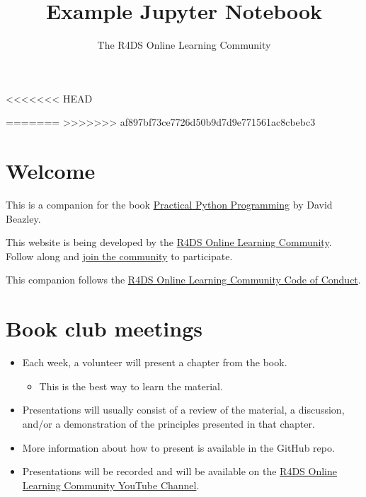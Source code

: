 \documentclass[
  letterpaper,
  DIV=11,
  numbers=noendperiod]{scrreprt}
\title{Example Jupyter Notebook}
\subtitle{The R4DS Online Learning Community}
\author{}
\date{}
\providecommand{\tightlist}{%
  \setlength{\itemsep}{0pt}\setlength{\parskip}{0pt}}
\renewcommand*\contentsname{Table of contents}
\begin{document}
\maketitle

<<<<<<< HEAD
\ifdefined\Shaded\renewenvironment{Shaded}{\begin{tcolorbox}[enhanced, sharp corners, boxrule=0pt, interior hidden, frame hidden, borderline west={3pt}{0pt}{shadecolor}]}{\end{tcolorbox}}\fi

=======
>>>>>>> af897bf73ce7726d50b9d7d9e771561ac8cbebc3
\renewcommand*\contentsname{Table of contents}
{
\hypersetup{linkcolor=}
\setcounter{tocdepth}{2}
\tableofcontents
}
\hypertarget{welcome}{%
\section*{Welcome}\label{welcome}}

This is a companion for the book
\href{https://dabeaz-course.github.io/practical-python/}{Practical
Python Programming} by David Beazley.

This website is being developed by the
\href{https://rfordatasci.com/}{R4DS Online Learning Community}. Follow
along and \href{https://r4ds.io/join}{join the community} to
participate.

This companion follows the \href{https://r4ds.io/conduct}{R4DS Online
Learning Community Code of Conduct}.

\hypertarget{book-club-meetings}{%
\section*{Book club meetings}\label{book-club-meetings}}

\begin{itemize}
\item
  Each week, a volunteer will present a chapter from the book.

  \begin{itemize}
  \tightlist
  \item
    This is the best way to learn the material.
  \end{itemize}
\item
  Presentations will usually consist of a review of the material, a
  discussion, and/or a demonstration of the principles presented in that
  chapter.
\item
  More information about how to present is available in the GitHub repo.
\item
  Presentations will be recorded and will be available on the
  \href{https://r4ds.io/youtube}{R4DS Online Learning Community YouTube
  Channel}.
\end{itemize}
\end{document}
